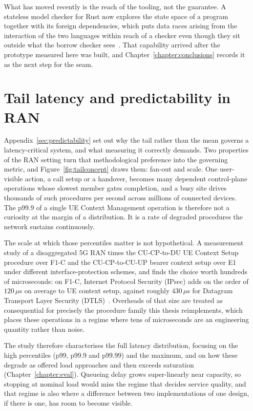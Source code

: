 \documentclass[english,oneside,a4paper,censored,csm,software-track-2020]{HYthesisML}
\begin{document}
\begin{appendices}
What has moved recently is the reach of the tooling, not the guarantee. A stateless model
checker for Rust now explores the state space of a program together with its foreign
dependencies, which puts data races arising from the interaction of the two languages within
reach of a checker even though they sit outside what the borrow checker
sees~\cite{pearce2026rustmc}. That capability arrived after the prototype measured here was
built, and Chapter~\ref{chapter:conclusions} records it as the next step for the seam.


\section{Tail latency and predictability in RAN}\label{appendix:rantail}
Appendix~\ref{sec:predictability} set out why the tail rather than the mean governs a
latency-critical system, and what measuring it correctly demands. Two properties of the RAN
setting turn that methodological preference into the governing metric, and
Figure~\ref{fig:tailconcept} draws them: fan-out and scale. One user-visible action, a call
setup or a handover, becomes many dependent control-plane operations whose slowest member gates
completion, and a busy site drives thousands of such procedures per second across millions of
connected devices. The p99.9 of a single UE Context Management operation is therefore not a
curiosity at the margin of a distribution. It is a rate of degraded procedures the network
sustains continuously.

The scale at which those percentiles matter is not hypothetical. A measurement study of a
disaggregated 5G RAN times the CU-CP-to-DU UE Context Setup procedure over F1-C and the
CU-CP-to-CU-UP bearer context setup over E1 under different interface-protection schemes, and
finds the choice worth hundreds of microseconds: on F1-C, Internet Protocol Security (IPsec)
adds on the order of $120\,\mu$s on average to UE context setup, against roughly $430\,\mu$s
for Datagram Transport Layer Security (DTLS)~\cite{michaelides2026ranlatency}. Overheads of that
size are treated as consequential for precisely the procedure family this thesis reimplements,
which places these operations in a regime where tens of microseconds are an engineering quantity
rather than noise.

The study therefore characterises the full latency distribution, focusing on the high
percentiles (p99, p99.9 and p99.99) and the maximum, and on how these degrade as offered load
approaches and then exceeds saturation (Chapter~\ref{chapter:eval}). Queueing delay grows
super-linearly near capacity, so stopping at nominal load would miss the regime that decides
service quality, and that regime is also where a difference between two implementations of one
design, if there is one, has room to become visible.


\end{appendices}
\end{document}
